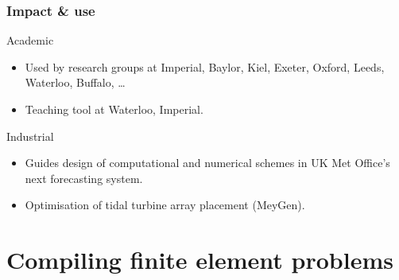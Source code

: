 \documentclass[presentation]{beamer}
\begin{document}
\begin{frame}
  \frametitle{Impact \& use}
  \begin{block}{Academic}
    \begin{itemize}
    \item Used by research groups at Imperial, Baylor, Kiel, Exeter,
      Oxford, Leeds, Waterloo, Buffalo, \ldots

    \item Teaching tool at Waterloo, Imperial.
    \end{itemize}
  \end{block}
  \begin{block}{Industrial}
    \begin{itemize}
    \item Guides design of computational and numerical schemes in UK
      Met Office's next forecasting system.

    \item Optimisation of tidal turbine array placement (MeyGen).
    \end{itemize}
  \end{block}
\end{frame}

\section{Compiling finite element problems}
\end{document}
